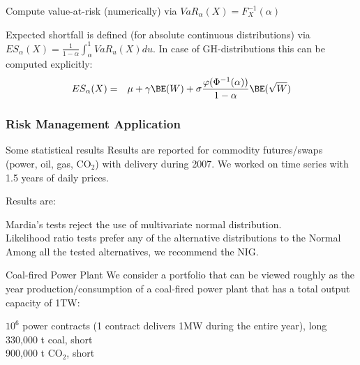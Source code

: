 	Compute value-at-risk
(numerically) via $ VaR_{\alpha}(X)=F^{-1}_X(\alpha) $

	
Expected shortfall is defined (for absolute continuous
distributions) via $ ES_{\alpha}(X)
=\frac{1}{1-\alpha}\int_{\alpha}^1VaR_u(X)du$. In case of
GH-distributions this can be computed explicitly:
\begin{eqnarray*}
ES_{\alpha}(X)&=&\mu+\gamma\BE(W)+\sigma\frac{\varphi(\Phi^{-1}(\alpha))}{1-\alpha}\BE(\sqrt{W})
\end{eqnarray*}





\subsubsection{Risk Management Application}

{Some statistical results} %
Results are reported for commodity futures/swaps (power, oil, gas,
CO$_2$) with delivery during 2007. We worked on time series with
1.5 years of daily prices.

Results are: %






	Mardia's tests reject the use of multivariate normal distribution.\\[-1.3cm]


	Likelihood ratio tests prefer any of the alternative distributions to the Normal\\[-1.3cm]


	Among all the tested alternatives, we recommend the NIG.





{Coal-fired Power Plant} We consider a portfolio
that can be viewed roughly as the year production/consumption of a
coal-fired power plant that has a total output capacity of 1TW:






	$10^6$ power contracts (1 contract delivers 1MW during the entire year), long \\[-1.5cm]


	330,000 t coal, short\\[-1.5cm]


	900,000 t CO$_2$, short


